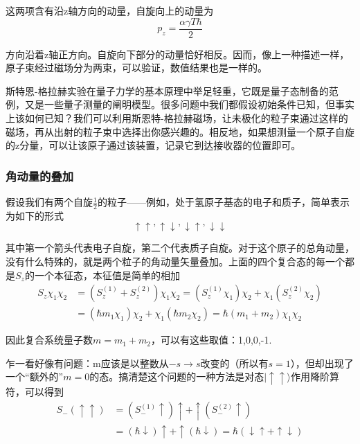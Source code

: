 \documentclass[UTF8]{ctexart}
\begin{document}
\noindent 这两项含有沿z轴方向的动量，自旋向上的动量为
\begin{equation}
    p_z = \frac{\alpha \gamma T \hbar}{2}
\end{equation}

\noindent 方向沿着z轴正方向。自旋向下部分的动量恰好相反。因而，像上一种描述一样，原子束经过磁场分为两束，可以验证，数值结果也是一样的。

    斯特恩-格拉赫实验在量子力学的基本原理中举足轻重，它既是量子态制备的范例，又是一些量子测量的阐明模型。很多问题中我们都假设初始条件已知，但事实上该如何已知？我们可以利用斯恩特-格拉赫磁场，让未极化的粒子束通过这样的磁场，再从出射的粒子束中选择出你感兴趣的。相反地，如果想测量一个原子自旋的z分量，可以让该原子通过该装置，记录它到达接收器的位置即可。

    \subsubsection{角动量的叠加}
    假设我们有两个自旋$\frac{1}{2}$的粒子——例如，处于氢原子基态的电子和质子，简单表示为如下的形式
    \begin{equation}
        \uparrow \uparrow, \uparrow \downarrow, \downarrow \uparrow, \downarrow \downarrow
    \end{equation}

\noindent 其中第一个箭头代表电子自旋，第二个代表质子自旋。对于这个原子的总角动量，没有什么特殊的，就是两个粒子的角动量矢量叠加。上面的四个复合态的每一个都是$S_z$的一个本征态，本征值是简单的相加
\begin{equation}
\begin{aligned} S_{z} \chi_{1} \chi_{2} &=\left(S_{z}^{(1)}+S_{z}^{(2)}\right) \chi_{1} \chi_{2}=\left(S_{z}^{(1)} \chi_{1}\right) \chi_{2}+\chi_{1}\left(S_{z}^{(2)} \chi_{2}\right) \\ &=\left(\hbar m_{1} \chi_{1}\right) \chi_{2}+\chi_{1}\left(\hbar m_{2} \chi_{2}\right)=\hbar\left(m_{1}+m_{2}\right) \chi_{1} \chi_{2} \end{aligned}
\end{equation}

\noindent 因此复合系统量子数$m = m_1 + m_2$，可以有这些取值：1,0,0,-1. 

    乍一看好像有问题：m应该是以整数从$-s \to s$改变的（所以有$s=1$），但却出现了一个“额外的”$m=0$的态。搞清楚这个问题的一种方法是对态$| \uparrow \uparrow \rangle$作用降阶算符，可以得到
    \begin{equation}
    \begin{aligned} S_{-}(\uparrow \uparrow) &=\left(S_{-}^{(1)} \uparrow\right) \uparrow+\uparrow\left(S_{-}^{(2)} \uparrow\right) \\ &=(\hbar \downarrow) \uparrow+\uparrow(\hbar \downarrow)=\hbar(\downarrow \uparrow+\uparrow \downarrow) \end{aligned}
    \end{equation}
\end{document}
